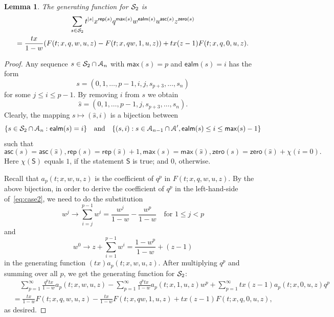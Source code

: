 \documentclass[12pt]{amsart}
\newcounter{mycount}
\theoremstyle{plain}
\newtheorem{lemma}[mycount]{Lemma}
\theoremstyle{definition}
\theoremstyle{example}
\theoremstyle{remark}
\numberwithin{equation}{section}
\numberwithin{figure}{section}
\newcommand{\asc}{\mathsf{asc}}
\def\max{\mathsf{max}}
\def\zero{\mathsf{zero}}
\def\rep{\mathsf{rep}}
\def\ealm{\mathsf{ealm}}
\def\A{\mathcal{A}}
\def\CS{ \CMcal{S}}
\begin{document}
\begin{lemma}\label{L:case2}
The generating function for $\CS_2$ is
\begin{multline}\label{eq:case2}
 \sum_{s\in\CS_{2}}t^{\vert s\vert}x^{\rep(s)}q^{\max(s)}w^{\ealm(s)}u^{\asc(s)}z^{\zero(s)}
\\=\frac{tx}{1-w}(F(t;x,q,w,u,z)-F(t;x,qw,1,u,z))+tx(z-1)F(t;x,q,0,u,z).
\end{multline}
\end{lemma}

\begin{proof}
Any sequence $s\in\CS_2\cap\A_n$ with $\max(s)=p$ and $\ealm(s)=i$ has the form
$$
s=(0,1,\ldots,p-1,i,j,s_{p+3},\ldots,s_n)
$$
for some $j\leq i\leq p-1$. By removing $i$ from $s$ we obtain
$$
\hat{s}=(0,1,\ldots,p-1,j,s_{p+3},\ldots, s_{n}).
$$
Clearly, the mapping $s\mapsto (\hat{s},i)$ is a bijection between
$$
\{s\in\CS_2\cap\A_{n}:\ealm(s)=i\}\quad\text{and}\quad\{(s,i): s\in\A_{n-1}\cap\A',  \ealm(s)\le i\le\max(s)-1\}
$$
such that
$$
\asc(s)=\asc(\hat{s}), \rep(s)=\rep(\hat{s})+1, \max(s)=\max(\hat{s}), \zero(s)=\zero(\hat{s})+\chi(i=0).
$$
Here $\chi(\mathsf{S})$ equals $1$, if the statement $\mathsf{S}$ is true; and $0$, otherwise.

Recall that $a_p(t;x,w,u,z)$ is the coefficient of $q^p$ in $F(t;x,q,w,u,z)$. By the above bijection, in order to derive the coefficient of $q^p$ in the left-hand-side of~\eqref{eq:case2}, we need to do the substitution
$$
w^j\rightarrow \sum_{i=j}^{p-1}w^i=\frac{w^j}{1-w}-\frac{w^p}{1-w}\quad \text{for  $1\le j<p$}
$$
 and
$$
w^0\rightarrow z+\sum_{i=1}^{p-1}w^i=\frac{1-w^p}{1-w}+(z-1)
$$
in the generating function $(tx)a_p(t;x,w,u,z)$. After multiplying $q^p$ and summing over all $p$,  we get the generating function for $\CS_2$:
\begin{align*}
&\quad\sum_{p=1}^{\infty}\frac{q^ptx}{1-w}a_p(t;x,w,u,z)
-\sum_{p=1}^{\infty}\frac{q^ptx}{1-w}a_p(t;x,1,u,z)w^p+\sum_{p=1}^{\infty}
tx(z-1)a_p(t;x,0,u,z)q^p\\
&=\frac{tx}{1-w}F(t;x,q,w,u,z)-\frac{tx}{1-w}F(t;x,qw,1,u,z)+tx(z-1)F(t;x,q,0,u,z),
\end{align*}
as desired.
\end{proof}
\end{document}
